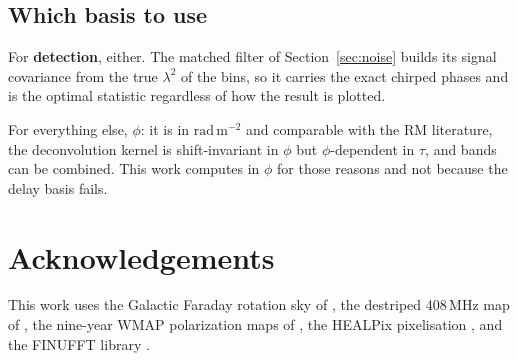 \documentclass[11pt]{article}
\newcommand{\rmu}{\ensuremath{\mathrm{rad\,m^{-2}}}}
\newcommand{\lamsq}{\ensuremath{\lambda^{2}}}
\begin{document}
\subsection{Which basis to use}

For \textbf{detection}, either. The matched filter of
Section~\ref{sec:noise} builds its signal covariance from the true
\lamsq{} of the bins, so it carries the exact chirped phases and is the
optimal statistic regardless of how the result is plotted.

For everything else, $\phi$: it is in \rmu{} and comparable with the RM
literature, the deconvolution kernel is shift-invariant in $\phi$ but
$\phi$-dependent in $\tau$, and bands can be combined. This work
computes in $\phi$ for those reasons and not because the delay basis
fails.

\section*{Acknowledgements}

This work uses the Galactic Faraday rotation sky of
\citet{hutschenreuter2022}, the destriped 408\,MHz map of
\citet{remazeilles2015}, the nine-year WMAP polarization maps of
\citet{bennett2013}, the HEALPix pixelisation \citep{gorski2005}, and
the FINUFFT library \citep{barnett2019}.
\end{document}
